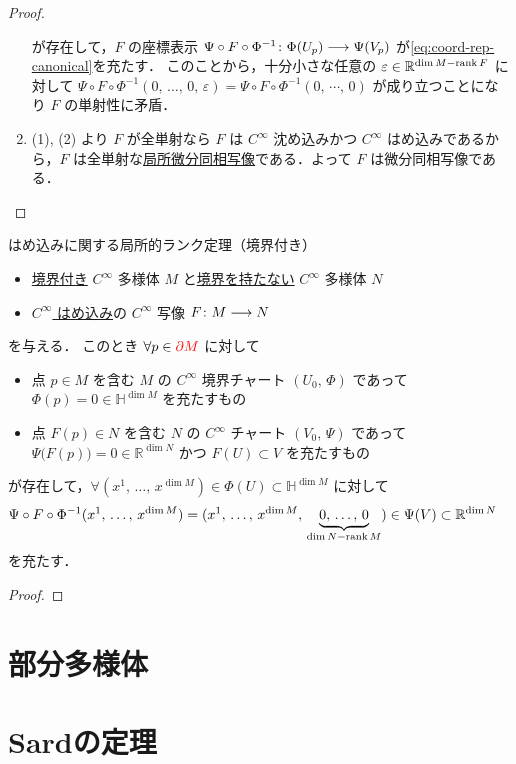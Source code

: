 \documentclass[TQFT_main]{subfiles}
\begin{document}
\begin{proof}
\begin{enumerate}
\begin{itemize}
        \end{itemize}
        が存在して，$F$ の座標表示 $\Psi \circ F \circ \Phi^{-1} \colon \Phi(U_p) \longrightarrow \Psi(V_p)$ が\eqref{eq:coord-rep-canonical}を充たす．
        このことから，十分小さな任意の $\varepsilon \in \mathbb{R}^{\dim M - \rank F}$ に対して $\Psi \circ F \circ \Phi^{-1}(0,\, \dots,\, 0,\, \varepsilon) = \Psi \circ F \circ \Phi^{-1}(0,\, \cdots,\, 0)$ が成り立つことになり $F$ の単射性に矛盾．
        \item (1), (2) より $F$ が全単射なら $F$ は $C^\infty$ 沈め込みかつ $C^\infty$ はめ込みであるから，$F$ は全単射な\hyperref[def:loc-diffeo]{局所微分同相写像}である．よって $F$ は微分同相写像である．
    \end{enumerate}
    
\end{proof}


\begin{mytheo}[label=thm:rank-b]{はめ込みに関する局所的ランク定理（境界付き）}
    \begin{itemize}
        \item \underline{境界付き} $C^\infty$ 多様体 $M$ と\underline{境界を持たない} $C^\infty$ 多様体 $N$
        \item \hyperref[def:submersion-smooth]{$C^\infty$ はめ込み}の $C^\infty$ 写像 $F \colon M \longrightarrow N$
    \end{itemize}
    を与える．
    このとき $\forall p \in \textcolor{red}{\partial M}$ に対して
    \begin{itemize}
        \item 点 $p \in M$ を含む $M$ の $C^\infty$ 境界チャート $(U_0,\, \Phi)$ であって $\Phi(p) = 0 \in \mathbb{H}^{\dim M}$ を充たすもの
        \item 点 $F(p) \in N$ を含む $N$ の $C^\infty$ チャート $(V_0,\, \Psi)$ であって $\Psi \bigl( F(p) \bigr) = 0 \in \mathbb{R}^{\dim N}$ かつ $F(U) \subset V$ を充たすもの
    \end{itemize}
    が存在して，$\forall (x^1,\, \dots,\, x^{\dim M}) \in \Phi(U) \subset \mathbb{H}^{\dim M}$ に対して
    \begin{align}
        \label{eq:coord-rep-canonical-b}
        \Psi \circ F \circ \Phi^{-1} &(x^1,\, \dots,\, x^{\dim M}) = (x^1,\, \dots,\, x^{\dim M},\, \underbrace{0,\, \dots,\, 0}_{\dim N - \rank M}) \in \Psi(V) \subset \mathbb{R}^{\dim N}
    \end{align}
    を充たす．
\end{mytheo}

\begin{proof}
    
\end{proof}



\section{部分多様体}
\section{Sardの定理}
\end{document}

